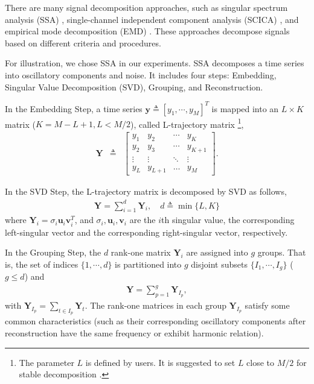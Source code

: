 \documentclass[10pt,twocolumn]{IEEEtran}
\begin{document}
There are many signal decomposition approaches, such as singular spectrum analysis (SSA) \cite{golyandina2001SSA,harris2010filtering}, single-channel independent component analysis (SCICA) \cite{james2003extracting,davies2007source},  and empirical mode decomposition (EMD) \cite{huang1998empirical}. These approaches decompose signals based on different criteria and procedures.

For illustration, we chose SSA in our experiments. SSA decomposes a time series into oscillatory components and noise. It includes four steps: Embedding, Singular Value Decomposition (SVD), Grouping, and Reconstruction.

In the Embedding Step, a time series $\mathbf{y} \triangleq [y_1,\cdots,y_M]^T$ is mapped into an $L \times K$ matrix ($K=M-L+1, L<M/2$), called L-trajectory matrix \footnote{The parameter $L$ is defined by users. It is suggested to set $L$ close to $M/2$ for stable decomposition \cite{golyandina2001SSA}.},
\begin{eqnarray}
\mathbf{Y}  & \triangleq & \left[ \begin{array}{cccc}
y_1      &      y_2       &      \cdots     &  y_K     \\
y_2      &      y_3       &       \cdots    &  y_{K+1} \\
\vdots   &      \vdots    &      \ddots     &  \vdots  \\
y_L      &      y_{L+1}   &    \ldots       &  y_M   \end{array} \right].
\end{eqnarray}


In the SVD Step, the L-trajectory matrix is decomposed by SVD as follows,
\begin{eqnarray}
\mathbf{Y} = \sum_{i=1}^d \mathbf{Y}_i, \quad d \triangleq  \min\{L,K\}
\end{eqnarray}
where $\mathbf{Y}_i = \sigma_i \mathbf{u}_i \mathbf{v}_i^T$, and $\sigma_i, \mathbf{u}_i, \mathbf{v}_i$ are the $i$th singular value, the corresponding left-singular vector and the corresponding right-singular vector, respectively.


In the Grouping Step, the $d$ rank-one matrix $\mathbf{Y}_i$ are assigned into $g$ groups. That is, the set of indices $\{1,\cdots,d\}$ is partitioned into $g$ disjoint subsets $\{I_1,\cdots,I_g\}$ ($g \leq d$) and
\begin{eqnarray}
\mathbf{Y} = \sum_{p=1}^g \mathbf{Y}_{I_p},
\end{eqnarray}
with $\mathbf{Y}_{I_p} = \sum_{t \in I_p} \mathbf{Y}_t$. The rank-one matrices in each group $\mathbf{Y}_{I_p}$ satisfy some common characteristics (such as their corresponding  oscillatory components after reconstruction have the same frequency or exhibit harmonic relation).
\end{document}
